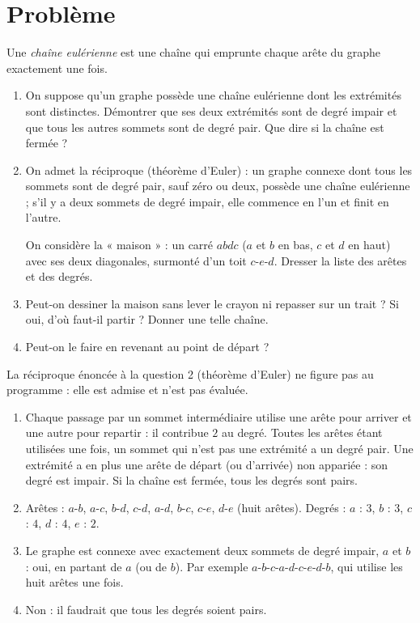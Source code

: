 \mxnewpage
\section{Problème}
\begin{problem}
Une \emph{chaîne eulérienne} est une chaîne qui emprunte chaque arête du graphe exactement une fois.
\begin{enumerate}
\item On suppose qu'un graphe possède une chaîne eulérienne dont les extrémités sont distinctes. Démontrer que ses deux extrémités sont de degré impair et que tous les autres sommets sont de degré pair. Que dire si la chaîne est fermée ?
\item On admet la réciproque (théorème d'Euler) : un graphe connexe dont tous les sommets sont de degré pair, sauf zéro ou deux, possède une chaîne eulérienne ; s'il y a deux sommets de degré impair, elle commence en l'un et finit en l'autre.\par
On considère la « maison » : un carré $abdc$ ($a$ et $b$ en bas, $c$ et $d$ en haut) avec ses deux diagonales, surmonté d'un toit $c$-$e$-$d$. Dresser la liste des arêtes et des degrés.
\item Peut-on dessiner la maison sans lever le crayon ni repasser sur un trait ? Si oui, d'où faut-il partir ? Donner une telle chaîne.
\item Peut-on le faire en revenant au point de départ ?
\end{enumerate}
\end{problem}
\begin{beyond}La réciproque énoncée à la question 2 (théorème d'Euler) ne figure pas au programme : elle est admise et n'est pas évaluée.\end{beyond}
\begin{solution}[Problème]
\begin{enumerate}
\item Chaque passage par un sommet intermédiaire utilise une arête pour arriver et une autre pour repartir : il contribue $2$ au degré. Toutes les arêtes étant utilisées une fois, un sommet qui n'est pas une extrémité a un degré pair. Une extrémité a en plus une arête de départ (ou d'arrivée) non appariée : son degré est impair. Si la chaîne est fermée, tous les degrés sont pairs.
\item Arêtes : $a$-$b$, $a$-$c$, $b$-$d$, $c$-$d$, $a$-$d$, $b$-$c$, $c$-$e$, $d$-$e$ (huit arêtes). Degrés : $a$ : $3$, $b$ : $3$, $c$ : $4$, $d$ : $4$, $e$ : $2$.
\item Le graphe est connexe avec exactement deux sommets de degré impair, $a$ et $b$ : oui, en partant de $a$ (ou de $b$). Par exemple $a$-$b$-$c$-$a$-$d$-$c$-$e$-$d$-$b$, qui utilise les huit arêtes une fois.
\item Non : il faudrait que tous les degrés soient pairs.
\end{enumerate}
\end{solution}
